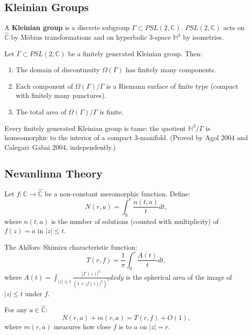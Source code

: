 \subsection{Kleinian Groups}

\begin{definition}
A \textbf{Kleinian group} is a discrete subgroup $\Gamma \subset PSL(2,\mathbb{C})$. $PSL(2,\mathbb{C})$ acts on $\widehat{\mathbb{C}}$ by M\"{o}bius transformations and on hyperbolic 3-space $\mathbb{H}^3$ by isometries.
\end{definition}

\begin{theorem}
Let $\Gamma \subset PSL(2,\mathbb{C})$ be a finitely generated Kleinian group. Then:
\begin{enumerate}
    \item The domain of discontinuity $\Omega(\Gamma)$ has finitely many components.
    \item Each component of $\Omega(\Gamma)/\Gamma$ is a Riemann surface of finite type (compact with finitely many punctures).
    \item The total area of $\Omega(\Gamma)/\Gamma$ is finite.
\end{enumerate}
\end{theorem}

\begin{theorem}
Every finitely generated Kleinian group is tame: the quotient $\mathbb{H}^3/\Gamma$ is homeomorphic to the interior of a compact 3-manifold. (Proved by Agol 2004 and Calegari--Gabai 2004, independently.)
\end{theorem}

\subsection{Nevanlinna Theory}

Let $f: \mathbb{C} \to \widehat{\mathbb{C}}$ be a non-constant meromorphic function. Define:
\[
N(r, a) = \int_0^r \frac{n(t, a)}{t} dt,
\]
where $n(t, a)$ is the number of solutions (counted with multiplicity) of $f(z) = a$ in $|z| \leq t$.

The Ahlfors--Shimizu characteristic function:
\[
T(r, f) = \frac{1}{\pi} \int_0^r \frac{A(t)}{t} dt,
\]
where $A(t) = \int_{|z| \leq t} \frac{|f'(z)|^2}{(1+|f(z)|^2)^2} dx dy$ is the spherical area of the image of $|z| \leq t$ under $f$.

\begin{theorem}
For any $a \in \widehat{\mathbb{C}}$:
\[
N(r, a) + m(r, a) = T(r, f) + O(1),
\]
where $m(r, a)$ measures how close $f$ is to $a$ on $|z| = r$.
\end{theorem}


